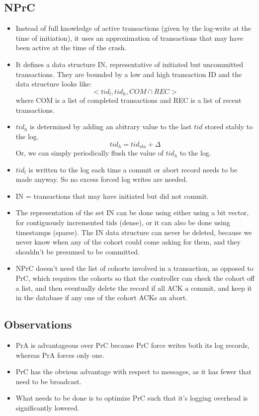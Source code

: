 \documentclass[a4paper]{article}
\begin{document}
\subsection{NPrC}

\begin{itemize}
    \item
    Instead of full knowledge of active transactions (given by the
    log-write at the time of initiation), it uses an approximation of
    transactions that may have been active at the time of the crash.
    \item
    It defines a data structure IN, representative of initiated but uncommitted transactions. They are bounded by a low and high transaction ID and the data structure looks like: $$<tid_l, tid_h, COM \cap REC >$$ where COM is a list of completed transactions and REC is a list of recent transactions.
    \item
    $tid_h$ is determined by adding an abitrary value to the last $tid$ stored stably to the log.
    $$tid_h = tid_{sta} + \Delta$$
    Or, we can simply periodically flush the value of $tid_h$ to the log.
    \item
    $tid_l$ is written to the log each time a commit or abort record needs to be made anyway. So no excess forced log writes are needed.
    \item
    IN = transactions that may have initiated but did not commit.
    \item 
    The representation of the set IN can be done using either using a bit vector, for contiguously incremented tids (dense), or it can also be done using timestamps (sparse). The IN data structure can never be deleted, because we never know when any of the cohort could come asking for them, and they shouldn't be presumed to be committed.
    \item 
    NPrC doesn't need the list of cohorts involved in a transaction, as opposed to PrC, which requires the cohorts so that the controller can check the cohort off a list, and then eventually delete the record if all ACK a commit, and keep it in the database if any one of the cohort ACKs an abort.
\end{itemize}

\subsection{Observations}

\begin{itemize}
\item
    PrA is advantageous over PrC because PrC force writes both its log
    records, whereas PrA forces only one.
\item
    PrC has the obvious advantage with respect to messages, as it has
    fewer that need to be broadcast.
\item
    What needs to be done is to optimize PrC such that it's logging
    overhead is significantly lowered.
\end{itemize}
\end{document}
